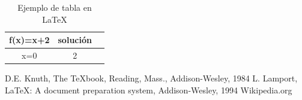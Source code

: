 \documentclass{article}
\begin{document}
 \begin{table}[h] 
 \begin{tabular}{|c|c|c|}
   
   \hline
   f(x)=x+2 & solución  \\
  \hline
   x=0 & 2 \\ \hline
   
 \end{tabular}
 
 \caption{Ejemplo de tabla en \LaTeX}
 \end{table}

 \begin{thebibliography}{1}
  D.E. Knuth, The TeXbook, Reading, Mass., Addison-Wesley, 1984
  L. Lamport, LaTeX: A document preparation system, Addison-Wesley, 1994
  Wikipedia.org
 \end{thebibliography}

 
\end{document}
